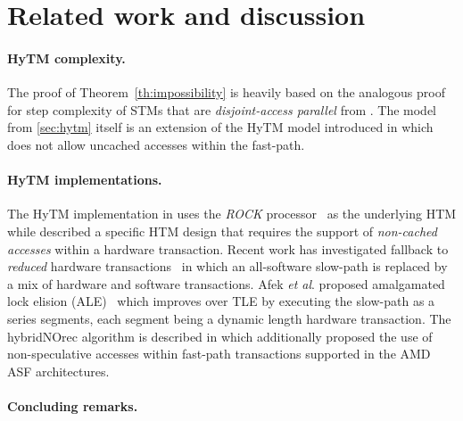 \section{Related work and discussion}
\label{sec:rel}
%
\paragraph{HyTM complexity.}
The proof of Theorem~\ref{th:impossibility} is heavily based on the analogous proof for step complexity of
STMs that are \emph{disjoint-access parallel} from \cite{prog15-pact}.
The model from \cref{sec:hytm} itself is an extension of the HyTM model introduced in \cite{hytm14disc}
which does not allow uncached accesses within the fast-path.

\paragraph{HyTM implementations.}
The HyTM implementation in \cite{damronhytm} uses the \emph{ROCK} processor~\cite{rock} as the underlying HTM
while \cite{kumarhytm} described a specific HTM design that requires the support of \emph{non-cached accesses}
within a hardware transaction. 
Recent work has investigated fallback to \emph{reduced} hardware transactions~\cite{MS13}
in which an all-software slow-path is replaced by a mix of hardware and software transactions. 
Afek \emph{et al}. proposed amalgamated lock elision (ALE)~\cite{ale15} which improves over TLE
by executing the slow-path as a series segments, each segment being a dynamic length hardware transaction.
The hybridNOrec algorithm is described in \cite{hynorecriegel} which additionally proposed the use of non-speculative accesses
within fast-path transactions supported in the AMD ASF architectures.

\paragraph{Concluding remarks.}